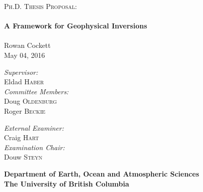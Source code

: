\begin{titlepage}

\begin{center}

\textsc{\Large Ph.D. Thesis Proposal:}\\[0.5cm]

\HRule\\[0.01cm]
{ \huge \bfseries \linespread{5} \vspace{0.5cm} A Framework for Geophysical Inversions}\\%
\HRule \\[0.75cm]
{\LARGE Rowan Cockett}\\[0.2cm]%
{\large May 04, 2016}\\[1.75cm]

\begin{minipage}[t]{0.4\textwidth}
\begin{flushleft} \large
\emph{Supervisor:}\\
Eldad \textsc{Haber}\\[1.2cm]

\emph{Committee Members:}\\
Doug \textsc{Oldenburg}\\
Roger \textsc{Beckie}\\
[1.2cm]
\end{flushleft}
\end{minipage}
%
\begin{minipage}[t]{0.4\textwidth}
\begin{flushright} \large
\emph{External Examiner:} \\
Craig \textsc{Hart} \\[1.2cm]

\emph{Examination Chair:} \\
Douw \textsc{Steyn}
\end{flushright}
\end{minipage}

\vspace{3.5cm}

\textbf{\large Department of Earth, Ocean and Atmospheric Sciences \\ [0.5cm]
\Large The University of British Columbia} \\[2.5cm]
\end{center}

\end{titlepage}
